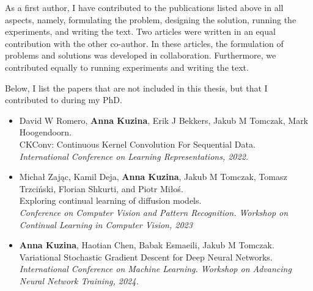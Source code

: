 As a first author, I have contributed to the publications listed above in all aspects, namely, formulating the problem, designing the solution, running the experiments, and writing the text. 
Two articles were written in an equal contribution with the other co-author.  
In these articles, the formulation of problems and solutions was developed in collaboration. Furthermore, we contributed equally to running experiments and writing the text.

Below, I list the papers that are not included in this thesis, but that I contributed to during my PhD. 
\begin{itemize}[leftmargin=15pt, rightmargin=10pt]
    \item David W Romero, \textbf{Anna Kuzina}, Erik J Bekkers, Jakub M Tomczak, Mark Hoogendoorn. \\
    CKConv: Continuous Kernel Convolution For Sequential Data. \\
    \textit{International Conference on Learning Representations, 2022.}
     \item Michał Zając, Kamil Deja, \textbf{Anna Kuzina}, Jakub M Tomczak, Tomasz Trzciński, Florian Shkurti, and Piotr Miłoś. \\
     Exploring continual learning of diffusion models. \\
     \textit{Conference on Computer Vision and Pattern Recognition. Workshop on Continual Learning in Computer Vision, 2023}
    \item \textbf{Anna Kuzina}\footnotemark[1], Haotian Chen\footnotemark[1], Babak Esmaeili, Jakub M Tomczak. \\
    Variational Stochastic Gradient Descent for Deep Neural Networks. \\
    \textit{International Conference on Machine Learning. Workshop on Advancing Neural Network Training, 2024.}
\end{itemize}

